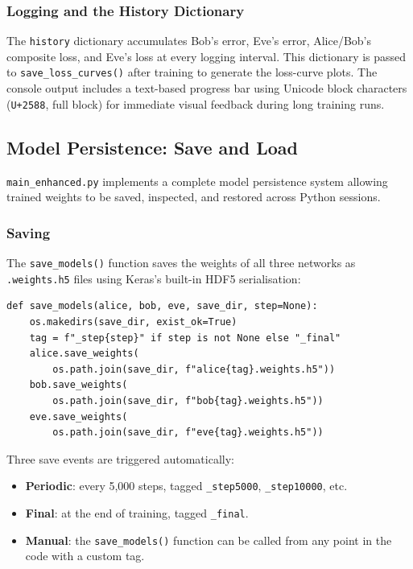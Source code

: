 \documentclass[12pt, a4paper]{article}
\newcommand{\code}[1]{\texttt{\color{CodeRed}#1}}
\begin{document}
\subsubsection*{Logging and the History Dictionary}

The \code{history} dictionary accumulates Bob's error, Eve's error,
Alice/Bob's composite loss, and Eve's loss at every logging interval.
This dictionary is passed to \code{save\_loss\_curves()} after training
to generate the loss-curve plots. The console output includes a text-based
progress bar using Unicode block characters (\texttt{U+2588}, full block)
for immediate visual feedback during long training runs.

\subsection{Model Persistence: Save and Load}
\label{subsec:persistence}

\code{main\_enhanced.py} implements a complete model persistence system
allowing trained weights to be saved, inspected, and restored across
Python sessions.

\subsubsection*{Saving}

The \code{save\_models()} function saves the weights of all three
networks as \texttt{.weights.h5} files using Keras's built-in HDF5
serialisation:

\begin{lstlisting}[caption={Model saving in \code{save\_models()}}]
def save_models(alice, bob, eve, save_dir, step=None):
    os.makedirs(save_dir, exist_ok=True)
    tag = f"_step{step}" if step is not None else "_final"
    alice.save_weights(
        os.path.join(save_dir, f"alice{tag}.weights.h5"))
    bob.save_weights(
        os.path.join(save_dir, f"bob{tag}.weights.h5"))
    eve.save_weights(
        os.path.join(save_dir, f"eve{tag}.weights.h5"))
\end{lstlisting}

Three save events are triggered automatically:
\begin{itemize}[leftmargin=1.8em, itemsep=3pt]
  \item \textbf{Periodic}: every 5{,}000 steps, tagged
        \code{\_step5000}, \code{\_step10000}, etc.
  \item \textbf{Final}: at the end of training, tagged \code{\_final}.
  \item \textbf{Manual}: the \code{save\_models()} function can be
        called from any point in the code with a custom tag.
\end{itemize}
\end{document}
